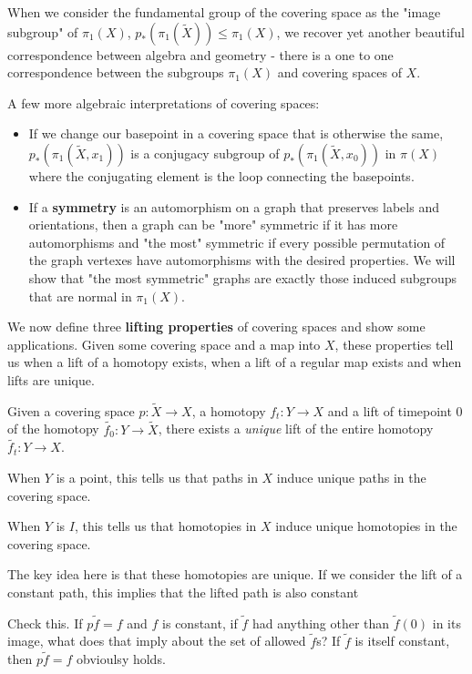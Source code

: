 \documentclass[10pt]{article}
\begin{document}
When we consider the fundamental group of the covering space as the "image
subgroup" of $\pi_1(X)$, $p_*(\pi_1(\tilde{X})) \leq \pi_1(X)$, we recover yet
another beautiful correspondence between algebra and geometry - there is a 
one to one correspondence between the subgroups $\pi_1(X)$ and covering spaces of $X$. 

A few more algebraic interpretations of covering spaces:

\begin{itemize}
	\item{If we change our basepoint in a covering space that is otherwise the
		same, $p_*(\pi_1(\tilde{X}, x_1))$ is a conjugacy subgroup of
		$p_*(\pi_1(\tilde{X}, x_0))$ in $\pi(X)$ where the conjugating element is the
	loop connecting the basepoints.}
\item{If a \textbf{symmetry} is an automorphism on a graph that preserves
		labels and orientations, then a graph can be "more" symmetric if it has
		more automorphisms and "the most" symmetric if every possible permutation
		of the graph vertexes have automorphisms with the desired properties. We
		will show that "the most symmetric" graphs are exactly those induced subgroups that
	are normal in $\pi_1(X)$.}
\end{itemize}

We now define three \textbf{lifting properties} of covering spaces and show
some applications. Given some covering space and a map into $X$, these
properties tell us when a lift of a homotopy exists, when a lift of a regular
map exists and when lifts are unique.

\begin{proposition}
	Given a covering space $p: \tilde{X} \to X$, a homotopy $f_t: Y \to X$ and a
	lift of timepoint 0 of the homotopy $\tilde{f_0}: Y \to \tilde{X}$, there
	exists a \textit{unique} lift of the entire homotopy $\tilde{f_t}: Y \to X$.
\end{proposition}

When $Y$ is a point, this tells us that paths in $X$ induce unique paths in the
covering space.

When $Y$ is $I$, this tells us that homotopies in $X$ induce unique homotopies
in the covering space.

The key idea here is that these homotopies are unique. If we consider the lift
of a constant path, this implies that the lifted path is also constant 

\begin{note}
Check this. If $p\tilde{f} = f$ and $f$ is constant, if $\tilde{f}$ had anything
other than $\tilde{f}(0)$ in its image, what does that imply about the set of
allowed $\tilde{f}$s? If $\tilde{f}$ is itself constant, then $p\tilde{f} = f$
obvioulsy holds. 
\end{note}
\end{document}
